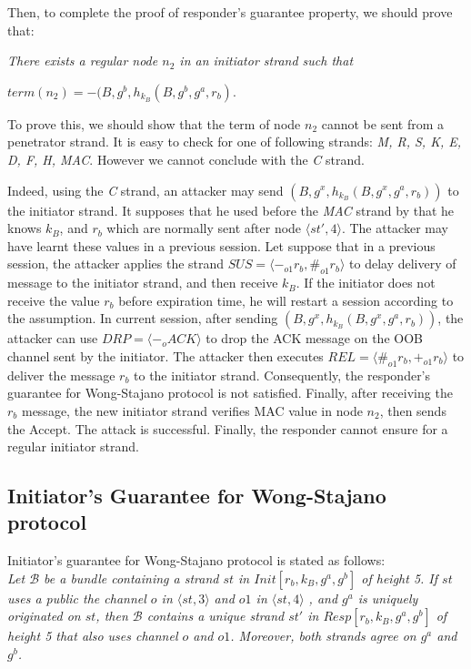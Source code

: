Then, to complete the proof of responder's guarantee property, we should prove that:
 
\textit{There exists a regular node $n_2$ in an initiator strand such that} \begin{center}$term(n_2) = -(B, g^b, h_{k_B}(B,g^b,g^a,r_b)$.\end{center}

To prove this, we should show that the term of node $n_2$ cannot be sent from a penetrator strand. It is easy to check for one of following strands: \textit{M, R, S, K, E, D, F, H, MAC}. However we cannot conclude with the \textit{C} strand.

Indeed, using the \textit{C} strand, an attacker may send $(B, g^{x}, h_{k_B}(B,g^{x},g^a,r_b))$ to the initiator strand. 
It supposes that he used before the \textit{MAC} strand by that he knows $k_B$, and $r_b$ which are normally sent after node $\langle st',4 \rangle$. The attacker may have learnt these values in a previous session. Let suppose that in a previous session, the attacker applies the strand $SUS = \langle -_{o1} r_b,\#_{o1} r_b \rangle$ to delay delivery of message to the initiator strand, and then receive $k_B$. If the initiator does not receive the value $r_b$ before expiration time, he will restart a session according to the assumption. In current session, after sending $(B, g^{x}, h_{k_B}(B,g^{x},g^a,r_b))$, the attacker can use $DRP = \langle -_o ACK \rangle$ to drop the ACK message on the OOB channel sent by the initiator. The attacker then executes $REL= \langle \#_{o1} r_b,+_{o1} r_b \rangle$ to deliver the message $r_b$ to the initiator strand. Consequently, the responder's guarantee for Wong-Stajano protocol is not satisfied. Finally, after receiving the $r_b$ message, the new initiator strand verifies MAC value in node $n_2$, then sends the Accept. The attack is successful. Finally, the responder cannot ensure for a regular initiator strand. 


\subsection{Initiator's Guarantee for Wong-Stajano protocol}

Initiator's guarantee for Wong-Stajano protocol is stated as follows:\\
\textit{
Let $\mathcal{B}$ be a bundle containing a strand $st$ in $Init[r_b, k_B,g^a,g^b]$ of height 5. If $st$ uses a public the channel $o$ in $\langle st,3 \rangle$ and $o1$ in $\langle st,4 \rangle$ , and $g^a$ is uniquely originated on $st$, then $\mathcal{B}$ contains a unique strand $st'$ in $Resp[r_b, k_B,g^a,g^b]$ of height 5 that also uses channel $o$ and $o1$. Moreover, both strands agree on $g^a$ and $g^b$.
}

